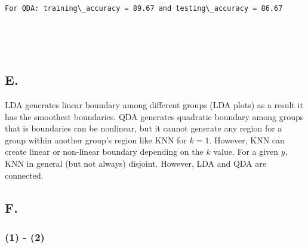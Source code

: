 \documentclass[11pt]{article}
\begin{document}
    \begin{Verbatim}[commandchars=\\\{\}]
For QDA: training\_accuracy = 89.67 and testing\_accuracy = 86.67
    \end{Verbatim}

    \begin{center}
    \end{center}
    { \hspace*{\fill} \\}
    
    \begin{center}
    \end{center}
    { \hspace*{\fill} \\}
    
    \hypertarget{e.}{%
\subsection{E.}\label{e.}}

    LDA generates linear boundary among different groups (LDA plots) as a
result it has the smoothest boundaries. QDA generates quadratic boundary
among groups that is boundaries can be nonlinear, but it cannot generate
any region for a group within another group's region like KNN for
\(k = 1\). However, KNN can create linear or non-linear boundary
depending on the \(k\) value. For a given \(y\), KNN in general (but not
always) disjoint. However, LDA and QDA are connected.

    \hypertarget{f.}{%
\subsection{F.}\label{f.}}

    \hypertarget{section}{%
\subsubsection{(1) - (2)}\label{section}}
\end{document}
